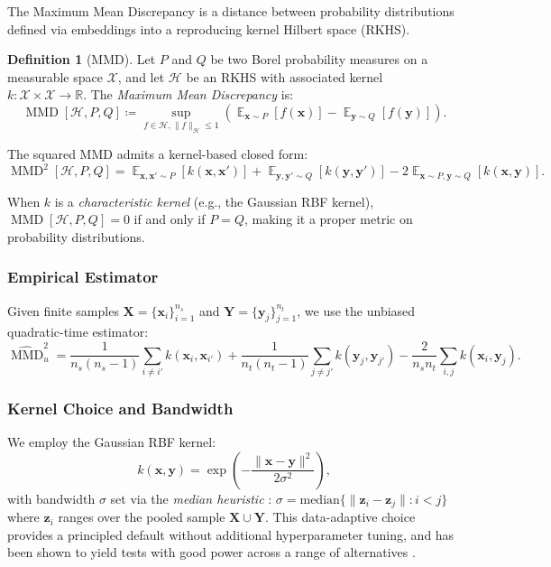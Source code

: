 \documentclass[11pt,a4paper]{article}
\DeclareMathOperator{\E}{\mathbb{E}}
\DeclareMathOperator{\MMD}{MMD}
\newcommand{\R}{\mathbb{R}}
\newcommand{\Hcal}{\mathcal{H}}
\newcommand{\Xcal}{\mathcal{X}}
\theoremstyle{definition}
\newtheorem{definition}{Definition}
\begin{document}
The Maximum Mean Discrepancy \cite{gretton2012} is a distance between probability distributions defined via embeddings into a reproducing kernel Hilbert space (RKHS).

\begin{definition}[MMD]
Let $P$ and $Q$ be two Borel probability measures on a measurable space $\Xcal$, and let $\Hcal$ be an RKHS with associated kernel $k: \Xcal \times \Xcal \to \R$. The \emph{Maximum Mean Discrepancy} is:
\begin{equation}\label{eq:mmd-pop}
  \MMD[\Hcal, P, Q] \coloneqq \sup_{f \in \Hcal, \|f\|_\Hcal \leq 1} \left( \E_{\bm{x} \sim P}[f(\bm{x})] - \E_{\bm{y} \sim Q}[f(\bm{y})] \right).
\end{equation}
\end{definition}

The squared MMD admits a kernel-based closed form:
\begin{equation}\label{eq:mmd-kernel}
  \MMD^2[\Hcal, P, Q] = \E_{\bm{x},\bm{x}' \sim P}[k(\bm{x}, \bm{x}')] + \E_{\bm{y},\bm{y}' \sim Q}[k(\bm{y}, \bm{y}')] - 2\E_{\bm{x}\sim P, \bm{y}\sim Q}[k(\bm{x}, \bm{y})].
\end{equation}

When $k$ is a \emph{characteristic kernel} (e.g., the Gaussian RBF kernel), $\MMD[\Hcal, P, Q] = 0$ if and only if $P = Q$, making it a proper metric on probability distributions.

\subsubsection{Empirical Estimator}

Given finite samples $\bm{X} = \{\bm{x}_i\}_{i=1}^{n_s}$ and $\bm{Y} = \{\bm{y}_j\}_{j=1}^{n_t}$, we use the unbiased quadratic-time estimator:
\begin{equation}\label{eq:mmd-empirical}
  \widehat{\MMD}^2_u = \frac{1}{n_s(n_s-1)} \sum_{i \neq i'} k(\bm{x}_i, \bm{x}_{i'}) + \frac{1}{n_t(n_t-1)} \sum_{j \neq j'} k(\bm{y}_j, \bm{y}_{j'}) - \frac{2}{n_s n_t} \sum_{i,j} k(\bm{x}_i, \bm{y}_j).
\end{equation}

\subsubsection{Kernel Choice and Bandwidth}

We employ the Gaussian RBF kernel:
\begin{equation}\label{eq:rbf}
  k(\bm{x}, \bm{y}) = \exp\!\left(-\frac{\|\bm{x} - \bm{y}\|^2}{2\sigma^2}\right),
\end{equation}
with bandwidth $\sigma$ set via the \emph{median heuristic} \cite{gretton2012}: $\sigma = \text{median}\{\|\bm{z}_i - \bm{z}_j\| : i < j\}$ where $\bm{z}_i$ ranges over the pooled sample $\bm{X} \cup \bm{Y}$. This data-adaptive choice provides a principled default without additional hyperparameter tuning, and has been shown to yield tests with good power across a range of alternatives \cite{ramdas2015}.
\end{document}
